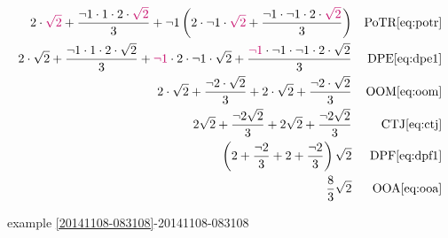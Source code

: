 \documentclass[20150903-160354-rs2.2-MarksMathNotebook.tex]{subfiles}
\begin{document}
\begin{example}[id:20141108-085327]
\begin{align*}
2 \cdot \alert{\sqrt{2}} + \dfrac{\neg 1 \cdot 1 \cdot 2 \cdot \alert{\sqrt{2}}}{3} + \neg 1 \left(2 \cdot \neg  1 \cdot \alert{\sqrt{2}} + \dfrac{\neg 1 \cdot \neg 1  \cdot 2 \cdot \alert{\sqrt{2}}}{3} \right) && \text{PoTR} \eqref{eq:potr} \\
2 \cdot \sqrt{2} + \dfrac{\neg 1 \cdot 1 \cdot 2 \cdot \sqrt{2}}{3} + \alert{\neg 1} \cdot 2 \cdot \neg  1 \cdot \sqrt{2} + \dfrac{\alert{\neg 1} \cdot \neg 1 \cdot \neg 1  \cdot 2 \cdot \sqrt{2}}{3}  && \text{DPE} \eqref{eq:dpe1} \\
2 \cdot \sqrt{2} + \dfrac{\neg 2 \cdot \sqrt{2}}{3} + 2 \cdot \sqrt{2} + \dfrac{\neg 2 \cdot \sqrt{2}}{3}  && \text{OOM} \eqref{eq:oom} \\
2\sqrt{2} + \dfrac{\neg 2\sqrt{2}}{3} + 2\sqrt{2} + \dfrac{\neg 2\sqrt{2}}{3} && \text{CTJ} \eqref{eq:ctj} \\
\left(2 + \dfrac{\neg 2}{3} + 2 + \dfrac{\neg 2}{3} \right)  \sqrt{2} && \text{DPF} \eqref{eq:dpf1} \\
\dfrac{8}{3}\sqrt{2} && \text{OOA} \eqref{eq:ooa}
\end{align*}

\qdepend

\qdependlist
example \ref{20141108-083108}-20141108-083108

\end{example}
\end{document}
